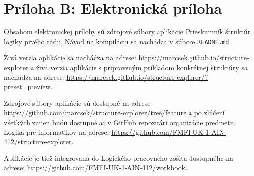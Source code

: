 \chapter*{Príloha B: Elektronická príloha}

Obsahom elektronickej prílohy sú zdrojové súbory aplikácie Prieskumník
štruktúr logiky prvého rádu. Návod na kompiláciu sa nachádza v súbore \texttt{README.md}

\medskip

Živá verzia aplikácie sa nachádza na adrese:
\url{https://marcsek.github.io/structure-explorer} a 
živá verzia aplikácie s pripraveným príkladom konkrétnej štruktúry sa nachádza na adrese:
\url{https://marcsek.github.io/structure-explorer/?preset=preview}.

\medskip

Zdrojové súbory aplikácie sú dostupné na adrese \url{https://github.com/marcsek/structure-explorer/tree/feature} a po zlúčení všetkých zmien budú dostupné aj v GitHub repozitári organizácie predmetu Logika pre informatikov na adrese: \url{https://github.com/FMFI-UK-1-AIN-412/structure-explorer}.

\medskip

Aplikácie je tiež integrovaná do Logického pracovného zošita dostupného na adrese: \url{https://github.com/FMFI-UK-1-AIN-412/workbook}.